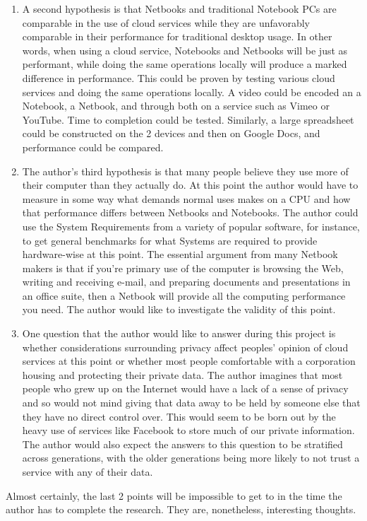 \begin{enumerate}
\item A second hypothesis is that Netbooks and traditional Notebook PCs are
  comparable in the use of cloud services while they are unfavorably comparable
  in their performance for traditional desktop usage.  In other words, when
  using a cloud service, Notebooks and Netbooks will be just as performant,
  while doing the same operations locally will produce a marked difference in
  performance.  This could be proven by testing various cloud services and doing
  the same operations locally.  A video could be encoded an a Notebook, a
  Netbook, and through both on a service such as Vimeo or YouTube.  Time to
  completion could be tested. Similarly, a large spreadsheet could be
  constructed on the 2 devices and then on Google Docs, and performance could be
  compared.

\item The author's third hypothesis is that many people believe they use more of
  their computer than they actually do.  At this point the author would have to
  measure in some way what demands normal uses makes on a CPU and how that
  performance differs between Netbooks and Notebooks.  The author could use the
  System Requirements from a variety of popular software, for instance, to get
  general benchmarks for what Systems are required to provide hardware-wise at
  this point.  The essential argument from many Netbook makers is that if you're
  primary use of the computer is browsing the Web, writing and receiving e-mail,
  and preparing documents and presentations in an office suite, then a Netbook
  will provide all the computing performance you need.  The author would like to
  investigate the validity of this point.

\item One question that the author would like to answer during this project is
  whether considerations surrounding privacy affect peoples' opinion of cloud
  services at this point or whether most people comfortable with a corporation
  housing and protecting their private data.  The author imagines that most
  people who grew up on the Internet would have a lack of a sense of privacy and
  so would not mind giving that data away to be held by someone else that they
  have no direct control over.  This would seem to be born out by the heavy use
  of services like Facebook to store much of our private information.  The
  author would also expect the answers to this question to be stratified across
  generations, with the older generations being more likely to not trust a
  service with any of their data.

\end{enumerate}

Almost certainly, the last 2 points will be impossible to get to in the time the
author has to complete the research.  They are, nonetheless, interesting thoughts. 
